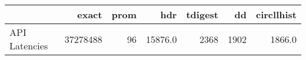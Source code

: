 \begin{tabular}{lrrrrrr}
\toprule
{} &     exact &  prom &      hdr &  tdigest &    dd &  circllhist \\
\midrule
API Latencies &  37278488 &    96 &  15876.0 &     2368 &  1902 &      1866.0 \\
\bottomrule
\end{tabular}
